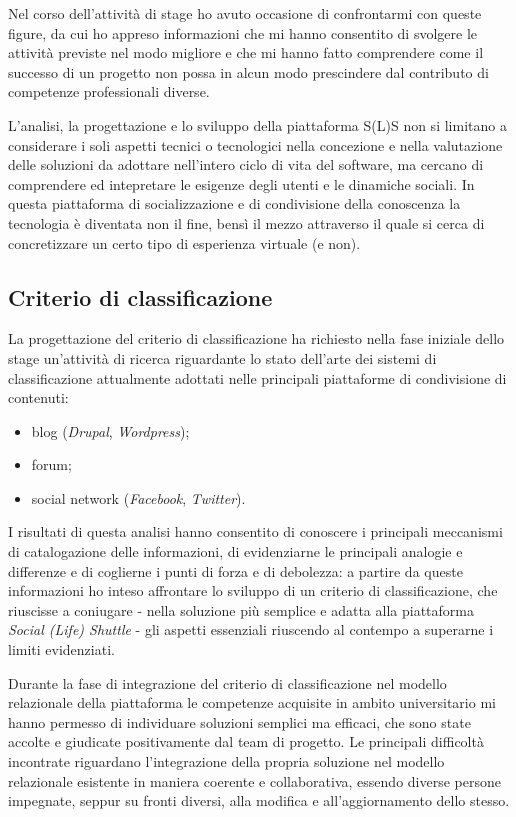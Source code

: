 Nel corso dell'attività di stage ho avuto occasione di confrontarmi con queste figure, da cui ho appreso informazioni che mi hanno consentito di svolgere le attività previste nel modo migliore e che mi hanno fatto comprendere come il successo di un progetto non possa in alcun modo prescindere dal contributo di competenze professionali diverse.

L'analisi, la progettazione e lo sviluppo della piattaforma S(L)S non si limitano a considerare i soli aspetti tecnici o tecnologici nella concezione e nella valutazione delle soluzioni da adottare nell'intero ciclo di vita del software, ma cercano di comprendere ed intepretare le esigenze degli utenti e le dinamiche sociali. In questa piattaforma di socializzazione e di condivisione della conoscenza la tecnologia è diventata non il fine, bensì il mezzo attraverso il quale si cerca di concretizzare un certo tipo di esperienza virtuale (e non).

\subsection{Criterio di classificazione}
La progettazione del criterio di classificazione ha richiesto nella fase iniziale dello stage un'attività di ricerca riguardante lo stato dell'arte dei sistemi di classificazione attualmente adottati nelle principali piattaforme di condivisione di contenuti:
\begin{itemize}
  \item blog (\textit{Drupal}, \textit{Wordpress});
  \item forum;
  \item social network (\textit{Facebook}, \textit{Twitter}).
\end{itemize}

I risultati di questa analisi hanno consentito di conoscere i principali meccanismi di catalogazione delle informazioni, di evidenziarne le principali analogie e differenze e di coglierne i punti di forza e di debolezza: a partire da queste informazioni ho inteso affrontare lo sviluppo di un criterio di classificazione, che riuscisse a coniugare - nella soluzione più semplice e adatta alla piattaforma \textit{Social (Life) Shuttle} - gli aspetti essenziali riuscendo al contempo a superarne i limiti evidenziati.

Durante la fase di integrazione del criterio di classificazione nel modello relazionale della piattaforma le competenze acquisite in ambito universitario mi hanno permesso di individuare soluzioni semplici ma efficaci, che sono state accolte e giudicate positivamente dal team di progetto. Le principali difficoltà incontrate riguardano l'integrazione della propria soluzione nel modello relazionale esistente in maniera coerente e collaborativa, essendo diverse persone impegnate, seppur su fronti diversi, alla modifica e all'aggiornamento dello stesso.


